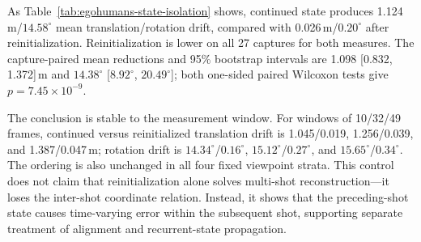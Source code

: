 \begin{table}[t]
  \centering
  \caption{Isolating recurrent-state carry-over on the fixed 90-case
  EgoHumans protocol. The same original Human3R checkpoint processes identical
  frames after the transition with the preceding-shot state or a reinitialized
  state. We report mean within-shot
  camera drift over the next 16 frames after anchoring the first pose,
  with equal weight for each of 27 captures.}
  \label{tab:egohumans-state-isolation}
  \small
  
\end{table}

As Table~\ref{tab:egohumans-state-isolation} shows, continued state produces
1.124\,m/$14.58^\circ$ mean translation/rotation drift, compared with
0.026\,m/$0.20^\circ$ after reinitialization. Reinitialization is lower on all
27 captures for both measures. The capture-paired mean reductions and 95\%
bootstrap intervals are 1.098 [0.832, 1.372]\,m and
$14.38^\circ$ [$8.92^\circ$, $20.49^\circ$]; both one-sided paired Wilcoxon
tests give $p=7.45\!\times\!10^{-9}$.

The conclusion is stable to the measurement window. For windows of 10/32/49 frames,
continued versus reinitialized translation drift is
1.045/0.019, 1.256/0.039, and 1.387/0.047\,m; rotation drift is
$14.34^\circ$/$0.16^\circ$, $15.12^\circ$/$0.27^\circ$, and
$15.65^\circ$/$0.34^\circ$. The ordering is also unchanged in all four fixed
viewpoint strata. This control does not claim that reinitialization alone
solves multi-shot reconstruction---it loses the inter-shot coordinate relation.
Instead, it shows that the preceding-shot state causes time-varying error
within the subsequent shot, supporting separate treatment of alignment and
recurrent-state propagation.

